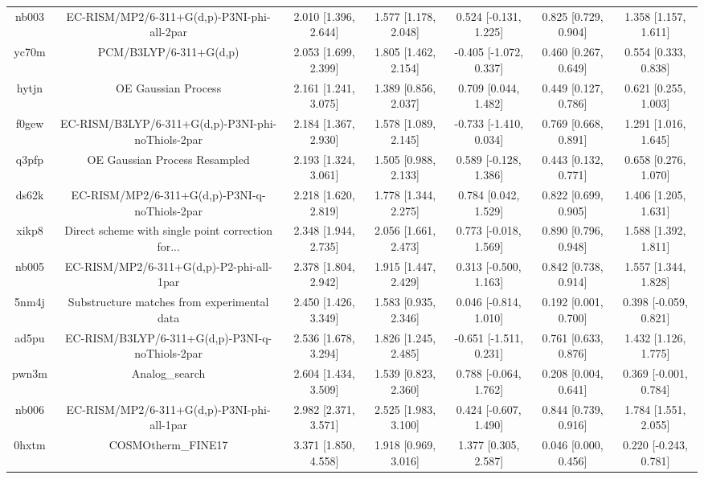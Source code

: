 \documentclass{article}
\begin{document}
\begin{center}
\begin{longtable}{|ccccccc|}
 nb003 &         EC-RISM/MP2/6-311+G(d,p)-P3NI-phi-all-2par &  2.010 [1.396, 2.644] &  1.577 [1.178, 2.048] &    0.524 [-0.131, 1.225] &  0.825 [0.729, 0.904] &   1.358 [1.157, 1.611] \\
 yc70m &                             PCM/B3LYP/6-311+G(d,p) &  2.053 [1.699, 2.399] &  1.805 [1.462, 2.154] &   -0.405 [-1.072, 0.337] &  0.460 [0.267, 0.649] &   0.554 [0.333, 0.838] \\
 hytjn &                                OE Gaussian Process &  2.161 [1.241, 3.075] &  1.389 [0.856, 2.037] &     0.709 [0.044, 1.482] &  0.449 [0.127, 0.786] &   0.621 [0.255, 1.003] \\
 f0gew &  EC-RISM/B3LYP/6-311+G(d,p)-P3NI-phi-noThiols-2par &  2.184 [1.367, 2.930] &  1.578 [1.089, 2.145] &   -0.733 [-1.410, 0.034] &  0.769 [0.668, 0.891] &   1.291 [1.016, 1.645] \\
 q3pfp &                      OE Gaussian Process Resampled &  2.193 [1.324, 3.061] &  1.505 [0.988, 2.133] &    0.589 [-0.128, 1.386] &  0.443 [0.132, 0.771] &   0.658 [0.276, 1.070] \\
 ds62k &      EC-RISM/MP2/6-311+G(d,p)-P3NI-q-noThiols-2par &  2.218 [1.620, 2.819] &  1.778 [1.344, 2.275] &     0.784 [0.042, 1.529] &  0.822 [0.699, 0.905] &   1.406 [1.205, 1.631] \\
 xikp8 &  Direct scheme with single point correction for... &  2.348 [1.944, 2.735] &  2.056 [1.661, 2.473] &    0.773 [-0.018, 1.569] &  0.890 [0.796, 0.948] &   1.588 [1.392, 1.811] \\
 nb005 &           EC-RISM/MP2/6-311+G(d,p)-P2-phi-all-1par &  2.378 [1.804, 2.942] &  1.915 [1.447, 2.429] &    0.313 [-0.500, 1.163] &  0.842 [0.738, 0.914] &   1.557 [1.344, 1.828] \\
 5nm4j &        Substructure matches from experimental data &  2.450 [1.426, 3.349] &  1.583 [0.935, 2.346] &    0.046 [-0.814, 1.010] &  0.192 [0.001, 0.700] &  0.398 [-0.059, 0.821] \\
 ad5pu &    EC-RISM/B3LYP/6-311+G(d,p)-P3NI-q-noThiols-2par &  2.536 [1.678, 3.294] &  1.826 [1.245, 2.485] &   -0.651 [-1.511, 0.231] &  0.761 [0.633, 0.876] &   1.432 [1.126, 1.775] \\
 pwn3m &                                     Analog\_search &  2.604 [1.434, 3.509] &  1.539 [0.823, 2.360] &    0.788 [-0.064, 1.762] &  0.208 [0.004, 0.641] &  0.369 [-0.001, 0.784] \\
 nb006 &         EC-RISM/MP2/6-311+G(d,p)-P3NI-phi-all-1par &  2.982 [2.371, 3.571] &  2.525 [1.983, 3.100] &    0.424 [-0.607, 1.490] &  0.844 [0.739, 0.916] &   1.784 [1.551, 2.055] \\
 0hxtm &                                 COSMOtherm\_FINE17 &  3.371 [1.850, 4.558] &  1.918 [0.969, 3.016] &     1.377 [0.305, 2.587] &  0.046 [0.000, 0.456] &  0.220 [-0.243, 0.781] \\
\end{longtable}
\end{center}
\end{document}
